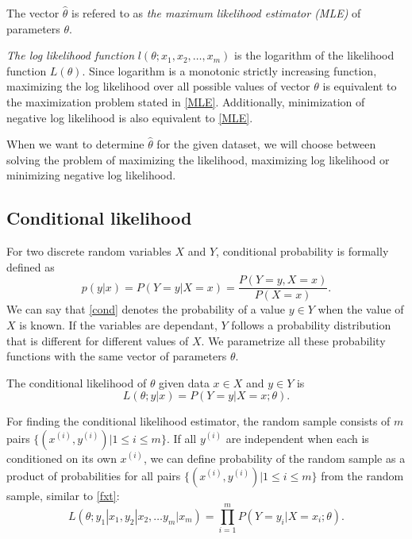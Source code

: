 \documentclass[times, utf8, zavrsni]{fer}
\begin{document}
The vector $\hat\theta$ is refered to as \emph{the maximum likelihood estimator (MLE)} of parameters $\theta$. 

\emph{The log likelihood function} $l(\theta; x_1, x_2, \dots, x_m)$ is the logarithm of the likelihood function $L(\theta)$. Since logarithm is a monotonic strictly increasing function, maximizing the log likelihood over all possible values of vector $\theta$ is equivalent to the maximization problem stated in \eqref{MLE}. Additionally, minimization of negative log likelihood is also equivalent to \eqref{MLE}.

When we want to determine $\hat\theta$ for the given dataset, we will choose between solving the problem of maximizing the likelihood, maximizing log likelihood or minimizing negative log likelihood.

\subsection{Conditional likelihood}

For two discrete random variables $X$ and $Y$, conditional probability is formally defined as 
\begin{equation}
\label{cond}
	p(y | x) = P(Y = y | X = x) = \frac{P(Y = y, X = x)}{P(X = x)}. 
\end{equation}
We can say that \eqref{cond} denotes the probability of a value $y \in Y$ when the value of $X$ is known. If the variables are dependant, $Y$ follows a probability distribution that is different for different values of $X$. We parametrize all these probability functions with the same vector of parameters $\theta$.

The conditional likelihood of $\theta$ given data $x \in X$ and $y \in Y$ is 
\begin{equation}
	L(\theta;y | x) = P(Y = y | X = x; \theta ).
\end{equation}

For finding the conditional likelihood estimator, the random sample consists of $m$  pairs $\{(x^{(i)}, y^{(i)}) | 1 \le i \le m\}$. If  all $y^{(i)}$ are independent when each is conditioned on its own $x^{(i)}$, we can define probability of the random sample as a product of probabilities for all pairs $\{(x^{(i)}, y^{(i)}) | 1 \le i \le m\}$ from the random sample, similar to \eqref{fxt}:
\begin{equation}
\label{fxt2}
 L(\theta; y_1|x_1, y_2 | x_2, \dots y_m | x_m) = \prod_{i=1}^{m}{P(Y = y_i | X = x_i;\theta)}    . 
\end{equation}
\end{document}
